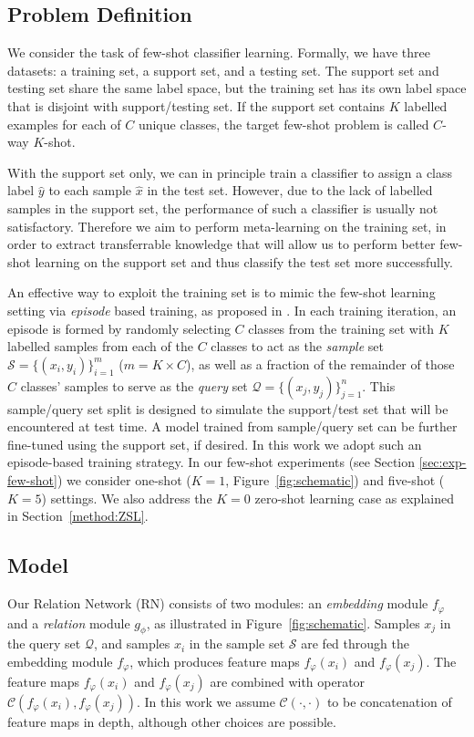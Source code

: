 \documentclass[10pt,twocolumn,letterpaper]{article}
\begin{document}
\subsection{Problem Definition}
We consider the task of few-shot classifier learning. Formally, we have three datasets: a training set, a support set, and a testing set. The  support set and testing set share the same label space, but the training set has its own label space that is disjoint with support/testing set. If the support set contains $K$ labelled examples for each of $C$ unique classes, the target few-shot problem is called $C$-way $K$-shot. 

With the support set only, we can in principle train a classifier to assign a class label $\hat{y}$ to each sample $\hat{x}$ in the test set. However, due to the lack of labelled samples in the support set, the performance of such a classifier is usually not satisfactory. Therefore we aim to perform meta-learning on the training set, in order to extract transferrable knowledge that will allow us to perform better few-shot learning on the support set and thus classify the test set more successfully.

An effective way to exploit the training set is to mimic the few-shot learning setting via {\em episode} based training, as proposed in \cite{vinyals2016matching}. In each training iteration, an episode is formed by randomly selecting $C$ classes from the training set with $K$ labelled samples from each of the $C$ classes to act as the \emph{sample} set $\mathcal{S} = \{ (x_{i}, y_{i})\}^{m}_{i=1}$ ($m = K \times C$), as well as a fraction 
of the remainder of those $C$ classes' samples to serve as the \emph{query} set $\mathcal{Q} = \{ (x_{j}, y_{j})\}^{n}_{j=1}$. This sample/query set split is designed to simulate the support/test set that will be encountered at test time. A model trained from sample/query set can be further fine-tuned using the support set, if desired. In this work we adopt such an episode-based training strategy. In our few-shot experiments (see Section \ref{sec:exp-few-shot}) we consider one-shot ($K=1$, Figure~\ref{fig:schematic}) and five-shot ($K=5$) settings. We also address the $K=0$ zero-shot learning case as explained in Section~\ref{method:ZSL}.




\subsection{Model}
Our Relation Network (RN) consists of two modules: an {\em embedding} module $f_{\varphi}$ and a {\em relation} module $g_{\phi}$, as illustrated in Figure~\ref{fig:schematic}. Samples $x_{j}$ in the query set $\mathcal{Q}$, and samples $x_i$ in the sample set $\mathcal{S}$ are fed through the embedding module $f_{\varphi}$, which produces feature maps  $f_{\varphi}(x_{i})$ and $f_{\varphi}(x_{j})$. The feature maps $f_{\varphi}(x_{i})$ and $f_{\varphi}(x_{j})$ are combined with operator $\mathcal{C}(f_{\varphi}(x_{i}),f_{\varphi}(x_{j}))$. In this work we assume $\mathcal{C}(\cdot,\cdot)$ to be concatenation of feature maps in depth, although other choices are possible.
\end{document}
